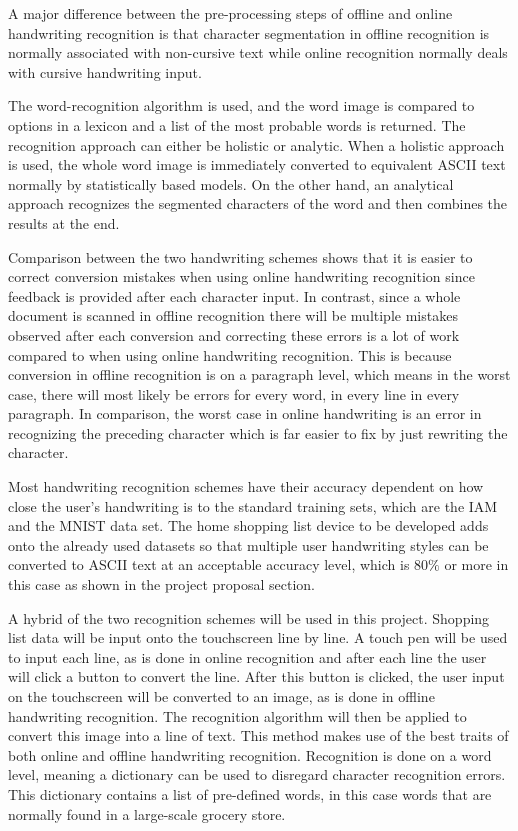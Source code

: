 A major difference between the pre-processing steps of offline and online handwriting recognition is that character segmentation in offline recognition is normally associated with non-cursive text while online recognition normally deals with cursive handwriting input.

The word-recognition algorithm is used, and the word image is compared to options in a lexicon and a list of the most probable words is returned. The recognition approach can either be holistic or analytic. When a holistic approach is used, the whole word image is immediately converted to equivalent ASCII text normally by statistically based models. On the other hand, an analytical approach recognizes the segmented characters of the word and then combines the results at the end.

Comparison between the two handwriting schemes shows that it is easier to correct conversion mistakes when using online handwriting recognition since feedback is provided after each character input. In contrast, since a whole document is scanned in offline recognition there will be multiple mistakes observed after each conversion and correcting these errors is a lot of work compared to when using online handwriting recognition. This is because conversion in offline recognition is on a paragraph level, which means in the worst case, there will most likely be errors for every word, in every line in every paragraph. In comparison, the worst case in online handwriting is an error in recognizing the preceding character which is far easier to fix by just rewriting the character.

Most handwriting recognition schemes have their accuracy dependent on how close the user’s handwriting is to the standard training sets, which are the IAM and the MNIST data set. The home shopping list device to be developed adds onto the already used datasets so that multiple user handwriting styles can be converted to ASCII text at an acceptable accuracy level, which is 80$\%$ or more in this case as shown in the project proposal section.

A hybrid of the two recognition schemes will be used in this project. Shopping list data will be input onto the touchscreen line by line. A touch pen will be used to input each line, as is done in online recognition and after each line the user will click a button to convert the line. After this button is clicked, the user input on the touchscreen will be converted to an image, as is done in offline handwriting recognition. The recognition algorithm will then be applied to convert this image into a line of text. This method makes use of the best traits of both online and offline handwriting recognition. Recognition is done on a word level, meaning a dictionary can be used to disregard character recognition errors. This dictionary contains a list of pre-defined words, in this case words that are normally found in a large-scale grocery store. 

